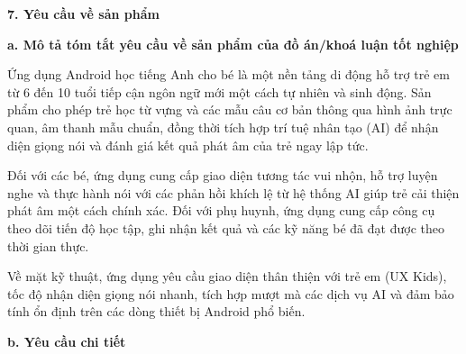 \documentclass[../main.tex]{subfiles}
\begin{document}
	\fontsize{12pt}{17pt}\selectfont
	
	\textbf{7. Yêu cầu về sản phẩm}
	
	\vspace{0.2cm}
	\textbf{a. Mô tả tóm tắt yêu cầu về sản phẩm của đồ án/khoá luận tốt nghiệp}
	
	Ứng dụng Android học tiếng Anh cho bé là một nền tảng di động hỗ trợ trẻ em từ 6 đến 10 tuổi tiếp cận ngôn ngữ mới một cách tự nhiên và sinh động. Sản phẩm cho phép trẻ học từ vựng và các mẫu câu cơ bản thông qua hình ảnh trực quan, âm thanh mẫu chuẩn, đồng thời tích hợp trí tuệ nhân tạo (AI) để nhận diện giọng nói và đánh giá kết quả phát âm của trẻ ngay lập tức.
	
	Đối với các bé, ứng dụng cung cấp giao diện tương tác vui nhộn, hỗ trợ luyện nghe và thực hành nói với các phản hồi khích lệ từ hệ thống AI giúp trẻ cải thiện phát âm một cách chính xác. Đối với phụ huynh, ứng dụng cung cấp công cụ theo dõi tiến độ học tập, ghi nhận kết quả và các kỹ năng bé đã đạt được theo thời gian thực.
	
	Về mặt kỹ thuật, ứng dụng yêu cầu giao diện thân thiện với trẻ em (UX Kids), tốc độ nhận diện giọng nói nhanh, tích hợp mượt mà các dịch vụ AI và đảm bảo tính ổn định trên các dòng thiết bị Android phổ biến.
	
	\vspace{0.2cm}
	\textbf{b. Yêu cầu chi tiết}
	
\end{document}
